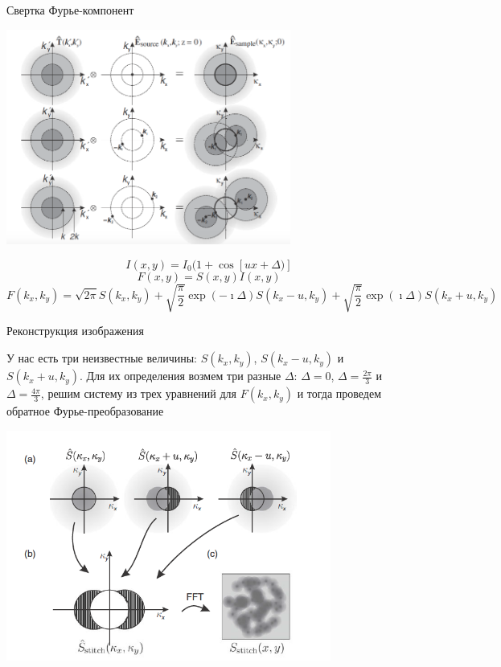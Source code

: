 \documentclass[9pt, compress, xcolor=table]{beamer}
\begin{document}
\begin{frame}{Свертка Фурье-компонент}
\begin{center}
\includegraphics[width=0.7\textwidth]{ffm16}

\begin{equation*}
I(x,y) = I_0
(1+\cos [u x+\Delta)]
\end{equation*}
\begin{equation*}
F(x,y)=S(x,y) I(x,y)
\end{equation*}
\begin{equation*}
F(k_x,k_y)=\sqrt{2\pi} S(k_x,k_y)+\sqrt{\frac{\pi}{2}}\exp(-\imath \Delta)S(k_x-u,k_y)+\sqrt{\frac{\pi}{2}}\exp(\imath \Delta)S(k_x+u,k_y)
\end{equation*}

\end{center}
\end{frame}
\begin{frame}{Реконструкция изображения}

У нас есть три неизвестные величины:  $S(k_x,k_y)$, $S(k_x-u,k_y)$ и $S(k_x+u,k_y)$. Для их определения возмем три разные $\Delta$: $\Delta=0$, $\Delta = \frac{2\pi}{3}$ и $\Delta = \frac{4\pi}{3}$, решим систему из трех уравнений для $F(k_x,k_y)$ и тогда проведем обратное Фурье-преобразование

\begin{center}
\includegraphics[width=0.8\textwidth]{ffm17}
\end{center}
\end{frame}
\end{document}
